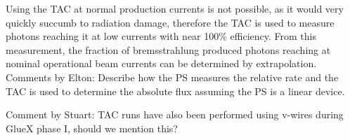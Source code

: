 Using the TAC at normal \GX{} production currents is not possible, as it would very quickly succumb to radiation damage, therefore the TAC is used to measure photons reaching it at low currents with near 100\% efficiency.
From this measurement, the fraction of bremsstrahlung produced photons reaching \GX{} at nominal operational beam currents can be determined by extrapolation.
{\color{red} Comments by Elton: Describe how the PS measures the relative rate and the TAC is used to determine the absolute flux assuming the PS is a linear device.}

{\color{red} Comment by Stuart: TAC runs have also been performed using v-wires during GlueX phase I, should we mention this?}

